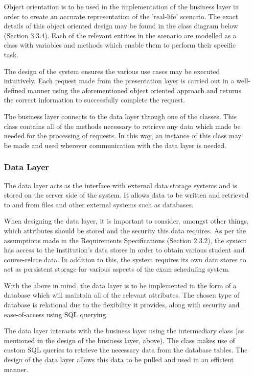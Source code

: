 \documentclass{article}
\begin{document}
Object orientation is to be used in the implementation of the business layer in order to create an accurate representation of the 'real-life' scenario. The exact details of this object oriented design may be found in the class diagram below (Section 3.3.4). Each of the relevant entities in the scenario are modelled as a class with variables and methods which enable them to perform their specific task.

The design of the system ensures the various use cases may be executed intuitively. Each request made from the presentation layer is carried out in a well-defined manner using the aforementioned object oriented approach and returns the correct information to successfully complete the request.

The business layer connects to the data layer through one of the classes. This class contains all of the methods necessary to retrieve any data which made be needed for the processing of requests. In this way, an instance of this class may be made and used wherever communication with the data layer is needed.

\subsubsection{Data Layer}
The data layer acts as the interface with external data storage systems and is stored on the server side of the system. It allows data to be written and
retrieved to and from files and other external systems such as databases.

When designing the data layer, it is important to consider, amongst other things, which attributes should be
stored and the security this data requires. As per the assumptions made in the Requirements Specifications (Section 2.3.2), the system has access to the institution's data stores in order to obtain various student and course-relate data. In addition to this, the system requires its own data stores to act as persistent storage for various aspects of the exam scheduling system.

With the above in mind, the data layer is to be implemented in the form of a database which will maintain all of the relevant attributes. The chosen type of database is relational due to the flexibility it provides, along with security and ease-of-access using SQL querying.

The data layer interacts with the business layer using the intermediary class (as mentioned in the design of the business layer, above). The class makes use of custom SQL queries to retrieve the necessary data from the database tables. The design of the data layer allows this data to be pulled and used in an efficient manner.
\end{document}

